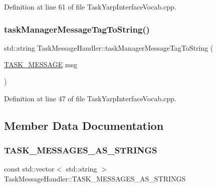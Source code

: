 Definition at line 61 of file Task\+Yarp\+Interface\+Vocab.\+cpp.

\hypertarget{classocra_1_1TaskMessageHandler_a2a0c5990fe24d82e0c58b6133857a4cd}{}\label{classocra_1_1TaskMessageHandler_a2a0c5990fe24d82e0c58b6133857a4cd} 
\subsubsection{\texorpdfstring{task\+Manager\+Message\+Tag\+To\+String()}{taskManagerMessageTagToString()}}
{\footnotesize\ttfamily std\+::string Task\+Message\+Handler\+::task\+Manager\+Message\+Tag\+To\+String (\begin{DoxyParamCaption}\item[{\hyperlink{namespaceocra_ae51761f3980546f5ee4cbc6ebe4216dd}{T\+A\+S\+K\+\_\+\+M\+E\+S\+S\+A\+GE}}]{msg }\end{DoxyParamCaption})\hspace{0.3cm}{\ttfamily [static]}}



Definition at line 47 of file Task\+Yarp\+Interface\+Vocab.\+cpp.



\subsection{Member Data Documentation}
\hypertarget{classocra_1_1TaskMessageHandler_a9afe80001080bc12286069365ab918ee}{}\label{classocra_1_1TaskMessageHandler_a9afe80001080bc12286069365ab918ee} 
\subsubsection{\texorpdfstring{T\+A\+S\+K\+\_\+\+M\+E\+S\+S\+A\+G\+E\+S\+\_\+\+A\+S\+\_\+\+S\+T\+R\+I\+N\+GS}{TASK\_MESSAGES\_AS\_STRINGS}}
{\footnotesize\ttfamily const std\+::vector$<$ std\+::string $>$ Task\+Message\+Handler\+::\+T\+A\+S\+K\+\_\+\+M\+E\+S\+S\+A\+G\+E\+S\+\_\+\+A\+S\+\_\+\+S\+T\+R\+I\+N\+GS\hspace{0.3cm}{\ttfamily [static]}}




